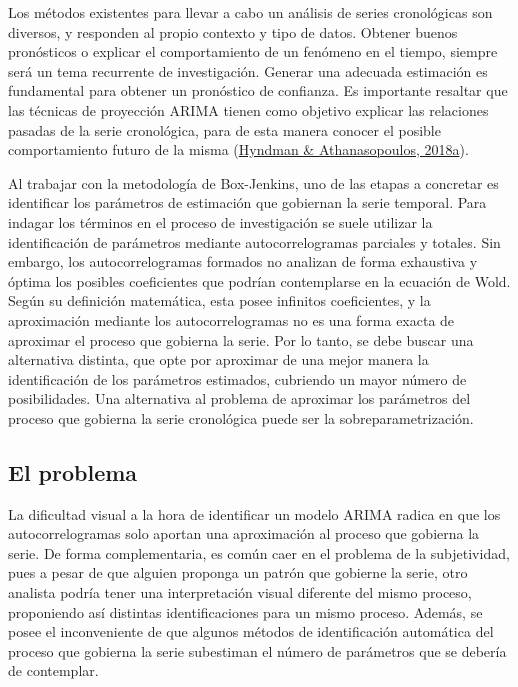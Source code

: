\documentclass[
]{article}
\begin{document}
Los métodos existentes para llevar a cabo un análisis de series
cronológicas son diversos, y responden al propio contexto y tipo de
datos. Obtener buenos pronósticos o explicar el comportamiento de un
fenómeno en el tiempo, siempre será un tema recurrente de investigación.
Generar una adecuada estimación es fundamental para obtener un
pronóstico de confianza. Es importante resaltar que las técnicas de
proyección ARIMA tienen como objetivo explicar las relaciones pasadas de
la serie cronológica, para de esta manera conocer el posible
comportamiento futuro de la misma
(\protect\hyperlink{ref-hyndman2018forecasting}{Hyndman \&
Athanasopoulos, 2018a}).

Al trabajar con la metodología de Box-Jenkins, uno de las etapas a
concretar es identificar los parámetros de estimación que gobiernan la
serie temporal. Para indagar los términos en el proceso de investigación
se suele utilizar la identificación de parámetros mediante
autocorrelogramas parciales y totales. Sin embargo, los
autocorrelogramas formados no analizan de forma exhaustiva y óptima los
posibles coeficientes que podrían contemplarse en la ecuación de Wold.
Según su definición matemática, esta posee infinitos coeficientes, y la
aproximación mediante los autocorrelogramas no es una forma exacta de
aproximar el proceso que gobierna la serie. Por lo tanto, se debe buscar
una alternativa distinta, que opte por aproximar de una mejor manera la
identificación de los parámetros estimados, cubriendo un mayor número de
posibilidades. Una alternativa al problema de aproximar los parámetros
del proceso que gobierna la serie cronológica puede ser la
sobreparametrización.

\subsection{El problema}

La dificultad visual a la hora de identificar un modelo ARIMA radica en
que los autocorrelogramas solo aportan una aproximación al proceso que
gobierna la serie. De forma complementaria, es común caer en el problema
de la subjetividad, pues a pesar de que alguien proponga un patrón que
gobierne la serie, otro analista podría tener una interpretación visual
diferente del mismo proceso, proponiendo así distintas identificaciones
para un mismo proceso. Además, se posee el inconveniente de que algunos
métodos de identificación automática del proceso que gobierna la serie
subestiman el número de parámetros que se debería de contemplar.
\end{document}
